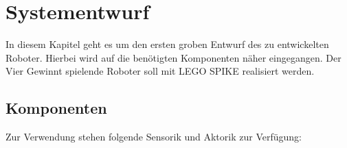 \chapter{Systementwurf}
\label{cha:Systementwurf}
In diesem Kapitel geht es um den ersten groben Entwurf des zu entwickelten Roboter. Hierbei wird auf die benötigten Komponenten näher eingegangen. Der Vier Gewinnt spielende Roboter soll mit LEGO SPIKE realisiert werden.  




\section{Komponenten}
Zur Verwendung stehen folgende Sensorik und Aktorik zur Verfügung:


